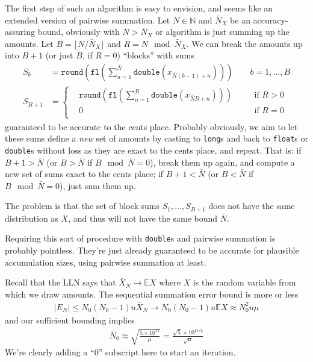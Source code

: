 \documentclass[11pt, oneside]{amsart}   	%
\begin{document}
The first step of such an algorithm is easy to envision, and seems like an extended version of pairwise summation. Let $N \in \mathbb{N}$ and $\bar{N}_X$ be an accuracy-assuring bound, obviously with $N > \bar{N}_X$ or algorithm is just summing up the amounts. Let $B = \lfloor N/\bar{N}_X \rfloor$ and $R = N \mod \bar{N}_X$. We can break the amounts up into $B+1$ (or just $B$, if $R=0$) ``blocks'' with sums
\begin{align*}
	S_b &= \texttt{round}\left( \texttt{fl}\left( \sum_{n=1}^{\bar{N}} \texttt{double}(x_{\bar{N}(b-1) + n}) \right) \right) \quad\quad b = 1,\dotsc,B \\
	S_{B+1} &= \left\{ \begin{aligned}
			&\texttt{round}\left( \texttt{fl}\left( \sum_{n=1}^{R} \texttt{double}(x_{\bar{N}B + n}) \right) \right) &&\quad \text{if } R > 0 \\
			&0 &&\quad \text{if } R = 0 \\
		\end{aligned} \right .
\end{align*}
guaranteed to be accurate to the cents place. Probably obviously, we aim to let these sums define a {\em new} set of amounts by casting to \texttt{long}s and back to \texttt{float}s or \texttt{double}s without loss as they are exact to the cents place, and repeat. That is: if $B+1 > \bar{N}$ (or $B > \bar{N}$ if $B \mod \bar{N} = 0$), break them up again, and compute a new set of sums exact to the cents place; if $B+1 < \bar{N}$ (or $B < \bar{N}$ if $B \mod \bar{N} = 0$), just sum them up. 

The problem is that the set of block sums $S_1,\dotsc,S_{B+1}$ does not have the same distribution as $X$, and thus will not have the same bound $\bar{N}$. 


Requiring this sort of procedure with \texttt{double}s and pairwise summation is probably pointless. They're just already guaranteed to be accurate for plausible accumulation sizes, using pairwise summation at least. 

Recall that the LLN says that $\bar{X}_N \to \mathbb{E}X$ where $X$ is the random variable from which we draw amounts. The sequential summation error bound is more or less
\begin{align*}
    | E_N | \leq N_0(N_0-1)u \bar{X}_{N} \to N_0(N_0-1)u \mathbb{E}X \approx N_0^2 u \mu
\end{align*}
and our sufficient bounding implies
\begin{align*}
    \bar{N}_0 \approx \sqrt{ \frac{5 \times 10^{15}}{\mu} }
    	= \frac{\sqrt{5} \times 10^{15/2}}{\sqrt{\mu}}
\end{align*}
We're clearly adding a ``$0$'' subscript here to start an iteration. 
\end{document}

